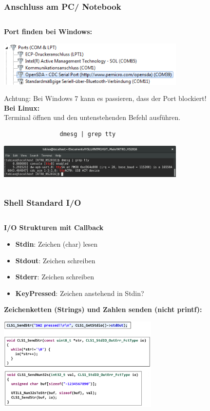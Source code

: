 \begin{frame}[fragile]
  \frametitle{Anschluss am PC/ Notebook}
	    \begin{column}{1\linewidth}
	    	\textbf{Port finden bei Windows:}\\
	    	\begin{center}
	    		\includegraphics[width=0.7\textwidth]{images/COM_Windows.png}
	    	\end{center}
	    	Achtung: Bei Windows 7 kann es passieren, dass der Port blockiert!\\[0.2cm]
	    	\textbf{Bei Linux:}\\
	    	Terminal öffnen und den untenstehenden Befehl ausführen.
			\begin{verbatim}
				dmesg | grep tty
			\end{verbatim}
			\begin{center}	    	
	    		\includegraphics[width=0.7\textwidth]{images/Console_Result_dmesc.png}
	    	\end{center}
	    \end{column}
\end{frame}

\begin{frame}
  \frametitle{Shell Standard I/O}
	    \begin{column}{1\linewidth}
	    	\textbf{I/O Strukturen mit Callback}\\
			\begin{itemize}
			\item \textbf{Stdin}: Zeichen (char) lesen
			\item \textbf{Stdout}: Zeichen schreiben
			\item \textbf{Stderr}: Zeichen schreiben
			\item \textbf{KeyPressed}: Zeichen anstehend in Stdin?
			\end{itemize}
	    	\textbf{Zeichenketten (Strings) und Zahlen senden (nicht printf):}
			\begin{center}	    	
	    		\includegraphics[width=0.6\textwidth]{images/Write_chars.png}
	    	\end{center}	    	
	    \end{column}
\end{frame}